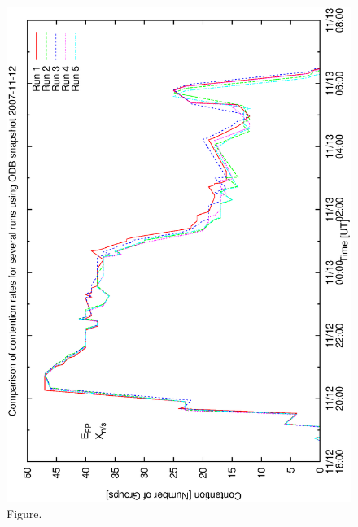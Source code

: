 \documentclass[12pt,a4paper]{article}
\begin{document}
\begin{figure}[htbp]
 \begin{center}
  \includegraphics[scale=1.0, angle=0]{figures/bsa0_pr.eps}
 \end{center}
  \caption[Figure.]
{Figure.}
\end{figure}
\clearpage
\end{document}
